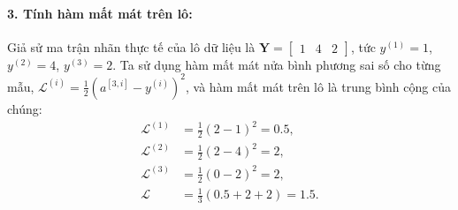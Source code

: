 \paragraph{3. Tính hàm mất mát trên lô:}
Giả sử ma trận nhãn thực tế của lô dữ liệu là $\mathbf{Y} = \begin{bmatrix} 1 & 4 & 2 \end{bmatrix}$, tức $y^{(1)} = 1$, $y^{(2)} = 4$, $y^{(3)} = 2$. Ta sử dụng hàm mất mát nửa bình phương sai số cho từng mẫu, $\mathcal{L}^{(i)} = \frac{1}{2}\left(a^{[3,i]} - y^{(i)}\right)^2$, và hàm mất mát trên lô là trung bình cộng của chúng:
\begin{align*}
\mathcal{L}^{(1)} &= \tfrac{1}{2}(2 - 1)^2 = 0.5, \\
\mathcal{L}^{(2)} &= \tfrac{1}{2}(2 - 4)^2 = 2, \\
\mathcal{L}^{(3)} &= \tfrac{1}{2}(0 - 2)^2 = 2, \\
\mathcal{L} &= \frac{1}{3}\left(0.5 + 2 + 2\right) = 1.5.
\end{align*}

